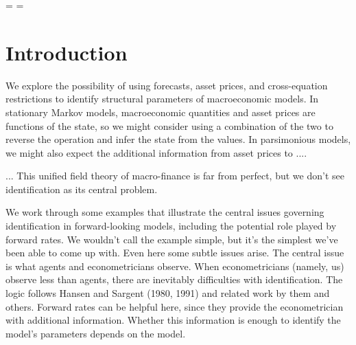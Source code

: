 \documentclass[11pt]{article}
\newcounter{tab}
\renewcommand{\thefootnote}{\fnsymbol{footnote}}
\begin{document}
\vfill
{

\medskip
{}

\newpage
\parskip=\bigskipamount
\setcounter{footnote}{0}
\renewcommand{\thefootnote}{\arabic{footnote}}
\setcounter{page}{1} \thispagestyle{empty}
\newlength{\oldbaselineskip}
\setlength{\oldbaselineskip}{\baselineskip}
\parskip= \bigskipamount

\section{Introduction}

We explore the possibility of using forecasts, asset prices, 
and cross-equation restrictions 
to identify structural parameters of macroeconomic models. 
In stationary Markov models, 
macroeconomic quantities and asset prices are functions of 
the state, 
so we might consider using a combination of the two to reverse
the operation and infer the state from the values.  
In parsimonious models, we might also expect the additional information
from asset prices to ....  


... This unified field theory of macro-finance is far from perfect, 
but we don't see identification as its central problem.  

We work through some examples that illustrate the central issues
governing identification in forward-looking models,
including the potential role played by forward rates.
We wouldn't call the example simple,
but it's the simplest we've been able to come up with.
Even here some subtle issues arise.
The central issue is what agents and econometricians observe.
When econometricians (namely, us) observe less than agents,
there are inevitably difficulties with identification.
The logic follows Hansen and Sargent (1980, 1991)
and related work by them and others.
Forward rates can be helpful here, since they
provide the econometrician with additional information.
Whether this information is enough to identify the model's parameters
depends on the model.

}
\end{document}
